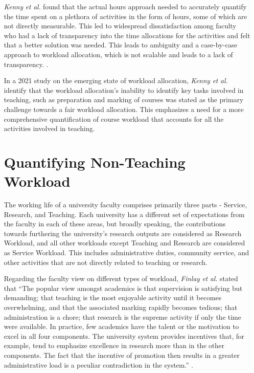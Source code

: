\textit{Kenny et al.} found that the actual hours approach needed to accurately quantify the time spent on a plethora of activities in the form of hours, some of which are not directly measurable. This led to widespread dissatisfaction among faculty who had a lack of transparency into the time allocations for the activities and felt that a better solution was needed. This leads to ambiguity and a case-by-case approach to workload allocation, which is not scalable and leads to a lack of transparency. \cite{kenny2014effectiveness}.

In a 2021 study on the emerging state of workload allocation, \textit{Kenny et al.} identify that the workload allocation's inability to identify key tasks involved in teaching, such as preparation and marking of courses was stated as the primary challenge towards a fair workload allocation. This emphasizes a need for a more comprehensive quantification of course workload that accounts for all the activities involved in teaching\cite{kenny2021emerging}.

\section{Quantifying Non-Teaching Workload}

The working life of a university faculty comprises primarily three parts - Service, Research, and Teaching. Each university has a different set of expectations from the faculty in each of these areas, but broadly speaking, the contributions towards furthering the university's research outputs are considered as Research Workload, and all other workloads except Teaching and Research are considered as Service Workload. This includes administrative duties, community service, and other activities that are not directly related to teaching or research.

Regarding the faculty view on different types of workload, \textit{Finlay et al.} stated that ``The popular view amongst academics is that supervision is satisfying but demanding; that
teaching is the most enjoyable activity until it becomes overwhelming, and that the associated marking rapidly becomes tedious; that administration is a chore; that research is the supreme activity if only the time were available. In practice, few academics have the talent or the motivation to excel in all four components. The university system provides incentives that, for example, tend to emphasize excellence in research more than in the other components. The fact that the incentive of promotion then results in a greater administrative load is a peculiar contradiction in the system.'' \cite{finlay1994management}.

